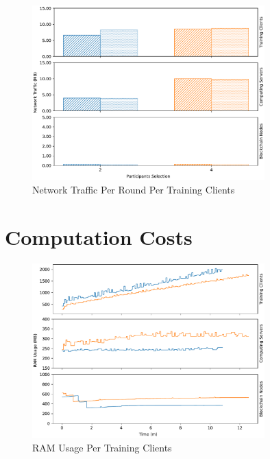 \begin{figure}[!ht]
    \centering
    \centering
    \includegraphics[width=0.8\textwidth]{graphics/vertical/net.pdf}
    \caption{Network Traffic Per Round Per Training Clients}
    \label{fig:net_vertical}
\end{figure}

\section{Computation Costs}

\begin{figure}[!hpt]
    \centering
    \centering
    \includegraphics[width=0.8\textwidth]{graphics/vertical/ram.pdf}
    \caption{RAM Usage Per Training Clients}
    \label{fig:ram_vertical}
\end{figure}

